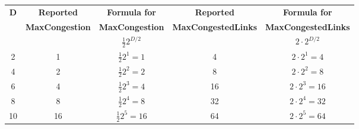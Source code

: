 \documentclass{article}
\newenvironment{answer}
{\color{blue}}
{\normalfont}
\begin{document}
\begin{enumerate}
\begin{enumerate}
\begin{answer}
                        \begin{center}
                            \begin{tabular}{|c|c|c|c|c|}
                                \hline
                                \textbf{D} & \textbf{Reported}      & \textbf{Formula for}    & \textbf{Reported}          & \textbf{Formula for}       \\
                                           & \textbf{MaxCongestion} & \textbf{MaxCongestion}  & \textbf{MaxCongestedLinks} & \textbf{MaxCongestedLinks} \\
                                           &                        & $\frac{1}{2}2^{D/2}$    &                            & $2 \cdot 2^{D/2}$          \\
                                \hline
                                2          & 1                      & $\frac{1}{2}2^{1} = 1$  & 4                          & $2 \cdot 2^{1} = 4$        \\
                                \hline
                                4          & 2                      & $\frac{1}{2}2^{2} = 2$  & 8                          & $2 \cdot 2^{2} = 8$        \\
                                \hline
                                6          & 4                      & $\frac{1}{2}2^{3} = 4$  & 16                         & $2 \cdot 2^{3} = 16$       \\
                                \hline
                                8          & 8                      & $\frac{1}{2}2^{4} = 8$  & 32                         & $2 \cdot 2^{4} = 32$       \\
                                \hline
                                10         & 16                     & $\frac{1}{2}2^{5} = 16$ & 64                         & $2 \cdot 2^{5} = 64$       \\
                                \hline
                            \end{tabular}
                        \end{center}


\end{answer}
\end{enumerate}
\end{enumerate}
\end{document}
